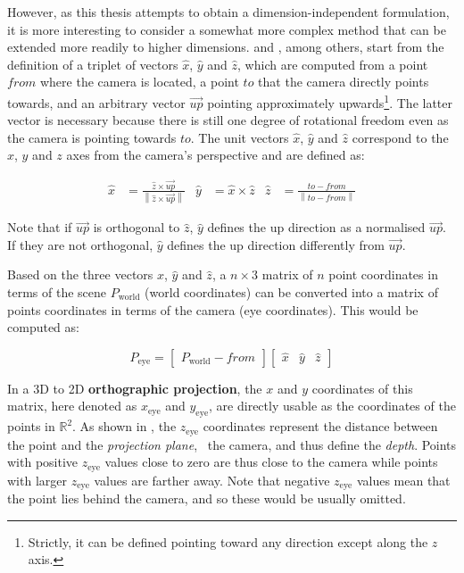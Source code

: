However, as this thesis attempts to obtain a dimension-independent formulation, it is more interesting to consider a somewhat more complex method that can be extended more readily to higher dimensions.
\citet{Foley92} and \citet[Ch.~13]{Hughes14}, among others, start from the definition of a triplet of vectors $\hat{x}$, $\hat{y}$ and $\hat{z}$, which are computed from a point $from$ where the camera is located, a point $to$ that the camera directly points towards, and an arbitrary vector $\overrightarrow{up}$ pointing approximately upwards\footnote{Strictly, it can be defined pointing toward any direction except along the $z$ axis.}.
The latter vector is necessary because there is still one degree of rotational freedom even as the camera is pointing towards $to$.
The unit vectors $\hat{x}$, $\hat{y}$ and $\hat{z}$ correspond to the $x$, $y$ and $z$ axes from the camera's perspective and are defined as:


\begin{align*}
\hat{x} &= \frac{\hat{z} \times \overrightarrow{up}}{\left\lVert{}\hat{z} \times \overrightarrow{up}\right\rVert} &
\hat{y} &= \hat{x} \times \hat{z} &
\hat{z} &= \frac{to-from}{\left\lVert{}to-from\right\rVert}
\end{align*}

Note that if $\overrightarrow{up}$ is orthogonal to $\hat{z}$, $\hat{y}$ defines the up direction as a normalised $\overrightarrow{up}$.
If they are not orthogonal, $\hat{y}$ defines the up direction differently from $\overrightarrow{up}$.

Based on the three vectors $\hat{x}$, $\hat{y}$ and $\hat{z}$, a $n \times 3$ matrix of $n$ point coordinates in terms of the scene $P_\mathrm{world}$ (world coordinates) can be converted into a matrix of points coordinates in terms of the camera (eye coordinates).
This would be computed as:

\begin{equation*}
P_\mathrm{eye} = \begin{bmatrix} P_\mathrm{world} - from \end{bmatrix}
\begin{bmatrix} \hat{x} & \hat{y} & \hat{z} \end{bmatrix}
\end{equation*}

In a 3D to 2D \textbf{orthographic projection}, the $x$ and $y$ coordinates of this matrix, here denoted as $x_\mathrm{eye}$ and $y_\mathrm{eye}$, are directly usable as the coordinates of the points in $\mathbb{R}^2$.
As shown in , the $z_\mathrm{eye}$ coordinates represent the distance between the point and the \emph{projection plane}, \ie\ the camera, and thus define the \emph{depth}.
Points with positive $z_\mathrm{eye}$ values close to zero are thus close to the camera while points with larger $z_\mathrm{eye}$ values are farther away.
Note that negative $z_\mathrm{eye}$ values mean that the point lies behind the camera, and so these would be usually omitted.

